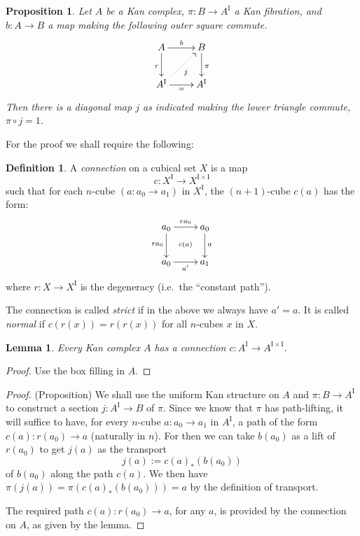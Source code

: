 \documentclass[12pt]{article}
\newcommand{\I}{\ensuremath{\mathrm{I}}}
\newcommand{\pA}{\ensuremath{A^\I}}
\newtheorem{proposition}[theorem]{Proposition}
\newtheorem{lemma}[theorem]{Lemma}
\theoremstyle{remark}
\theoremstyle{definition}
\newtheorem{definition}[theorem]{Definition}
\begin{document}
\begin{proposition}\label{prop:liftingnotnormal}
Let $A$ be a Kan complex, $\pi : B \to A^\I$ a Kan fibration, and $b : A\to B$ a map making the following outer square commute.
\begin{equation}\label{diagram:IdElim}
\xymatrix{
A \ar[d]_{r} \ar[r]^{b} & \ar[d]^{\pi} B \\
A^\I \ar@{..>}[ru]_{j} \ar[r]_{=} & A^\I
}
\end{equation}
Then there is a diagonal map $j$ as indicated making the lower triangle commute, $\pi\circ j = 1$.
\end{proposition}

For the proof we shall require the following:

\begin{definition}
A \emph{connection} on a cubical set $X$ is a map
\[
c : X^\I \to X^{\I\times\I}
\]
such that for each $n$-cube $(a: a_0\to a_1)$ in $X^\I$, the $(n+1)$-cube $c(a)$ has the form:
\begin{equation}\label{diagram:connection}
\xymatrix{
a_0 \ar[d]_{ra_0} \ar[r]^{ra_0} & \ar[d]^{a} a_0 \\
a_0 \ar@{}[ru]|{c(a)} \ar[r]_{a'} & a_1
}
\end{equation}
where $r : X\to X^\I$ is the degeneracy (i.e.\ the ``constant path'').

The connection is called \emph{strict} if in the above we always have $a'=a$.  It is called \emph{normal} if $c(r(x)) = r(r(x))$ for all $n$-cubes $x$ in $X$.
\end{definition}

\begin{lemma}
Every Kan complex  $A$ has a connection $c : A^\I \to A^{\I\times\I}$.
\end{lemma}
\begin{proof}
Use the box filling in $A$.
\end{proof}

\begin{proof} (Proposition)
We shall use the uniform Kan structure on $A$ and $\pi:B\to A^\I$ to construct a section $j:A^\I \to B$ of $\pi$.  Since we know that  $\pi$ has path-lifting, it will suffice to have, for every $n$-cube $a : a_0 \to a_1$ in $\pA$, a path of the form $c(a) : r(a_0) \to a$ (naturally in $n$).  For then we can take $b(a_0)$ as a lift of $r(a_0)$ to get $j(a)$ as the transport
\[
j(a) := c(a)_*(b(a_0))
\]
of $b(a_0)$ along the path $c(a)$.  We then have $\pi(j(a)) = \pi(c(a)_*(b(a_0))) = a$ by the definition of transport.  

The required path $c(a) : r(a_0) \to a$, for any $a$, is provided by the connection on $A$, as given by the lemma.
\end{proof}
\end{document}
